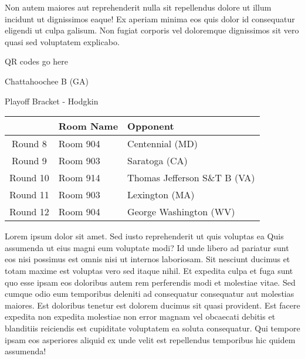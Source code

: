 \documentclass{article}%
\begin{document}
\newline%
Non autem maiores aut reprehenderit nulla sit repellendus dolore ut illum incidunt ut dignissimos eaque! Ex aperiam minima eos quis dolor id consequatur eligendi ut culpa galisum. Non fugiat corporis vel doloremque dignissimos sit vero quasi sed voluptatem explicabo.\newline%
\newline%
%
\vspace*{30pt}%
\begin{center}%
\begin{Huge}%
QR codes go here%
\end{Huge}%
\end{center}%
\newpage%
\begin{center}%
\begin{Huge}%
Chattahoochee B (GA)%
\end{Huge}%
\vspace*{8pt}%
\linebreak%
\begin{Large}%
Playoff Bracket {-} Hodgkin%
\end{Large}%
\end{center}%
\begin{tabularx}{\textwidth}{|c|Y|Y|}%
\hline%
&Room Name&Opponent\\%
\hline%
Round 8&Room 904&Centennial (MD)\\%
Round 9&Room 903&Saratoga (CA)\\%
Round 10&Room 914&Thomas Jefferson S\&T B (VA)\\%
Round 11&Room 903&Lexington (MA)\\%
Round 12&Room 904&George Washington (WV)\\%
\hline%
\end{tabularx}%
\vspace*{8pt}%
\linebreak%
\newline%
\newline%
Lorem ipsum dolor sit amet. Sed iusto reprehenderit ut quis voluptas ea Quis assumenda ut eius magni eum voluptate modi? Id unde libero ad pariatur sunt eos nisi possimus est omnis nisi ut internos laboriosam. Sit nesciunt ducimus et totam maxime est voluptas vero sed itaque nihil. Et expedita culpa et fuga sunt quo esse ipsam eos doloribus autem rem perferendis modi et molestiae vitae.\newline%
\newline%
Sed cumque odio eum temporibus deleniti ad consequatur consequatur aut molestias maiores. Est doloribus tenetur est dolorem ducimus sit quasi provident. Est facere expedita non expedita molestiae non error magnam vel obcaecati debitis et blanditiis reiciendis est cupiditate voluptatem ea soluta consequatur. Qui tempore ipsam eos asperiores aliquid ex unde velit est repellendus temporibus hic quidem assumenda!\newline%
\end{document}

